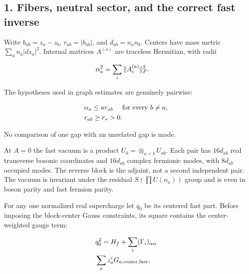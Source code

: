 \subsection{1. Fibers, neutral sector, and the correct fast
inverse}\label{c-fibers-neutral-sector-and-the-correct-fast-inverse}

Write \(b_{ab}=z_{a}-z_{b}\), \(r_{ab}=\vert b_{ab}\vert\), and
\(d_{ab}=n_{a} n_{b}\). Centers have mass metric
\(\sum _{a} n_{a} \vert dz_{a}\vert ^{2}\). Internal matrices
\(A^{(a)}\) are traceless Hermitian, with radii

\begin{gather*}
\begin{aligned}
& \alpha _{a}^{2} = \sum _{i} \Vert A_{i}^{(a)}\Vert _{F}^{2}.
\end{aligned}\notag
\end{gather*}

The hypotheses used in graph estimates are genuinely pairwise:

\begin{gather*}
\begin{aligned}
& \alpha _{a} \le  \kappa  r_{ab} \quad  \text{ for every } b \ne  a, \\
& r_{ab} \ge  r_{*} > 0.
\end{aligned}\notag
\end{gather*}

No comparison of one gap with an unrelated gap is made.

At \(A=0\) the fast vacuum is a product
\(U_{0}= \otimes _{a<b} U_{ab}\). Each pair has \(16d_{ab}\) real
transverse bosonic coordinates and \(16d_{ab}\) complex fermionic modes,
with \(8d_{ab}\) occupied modes. The reverse block is the adjoint, not a
second independent pair. The vacuum is invariant under the residual
\(S(\prod  U(n_{a}))\) group and is even in boson parity and fast
fermion parity.

For any one normalized real supercharge let \(q_{0}\) be its centered
fast part. Before imposing the block-center Gauss constraints, its
square contains the center-weighted gauge term:

\begin{gather*}
\begin{aligned}
& q_{0}^{2} = H_{f} + \sum _{i} (\Gamma _{i})_{\alpha  \alpha} \\
& \sum _{a} z_{a}^{i} G_{a,\mathrm{center},\mathrm{fast}},
\end{aligned}\notag
\end{gather*}

